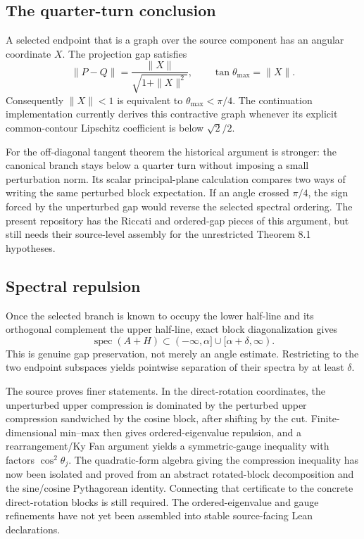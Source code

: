 \subsection{The quarter-turn conclusion}

A selected endpoint that is a graph over the source component has an angular
coordinate $X$.  The projection gap satisfies
\[
 \|P-Q\|=\frac{\|X\|}{\sqrt{1+\|X\|^2}},
 \qquad
 \tan\theta_{\max}=\|X\|.
\]
Consequently $\|X\|<1$ is equivalent to
$\theta_{\max}<\pi/4$.  The continuation implementation currently derives
this contractive graph whenever its explicit common-contour Lipschitz
coefficient is below $\sqrt2/2$.

For the off-diagonal tangent theorem the historical argument is stronger: the
canonical branch stays below a quarter turn without imposing a small
perturbation norm.  Its scalar principal-plane calculation compares two ways
of writing the same perturbed block expectation.  If an angle crossed
$\pi/4$, the sign forced by the unperturbed gap would reverse the selected
spectral ordering.  The present repository has the Riccati and ordered-gap
pieces of this argument, but still needs their source-level assembly for the
unrestricted Theorem 8.1 hypotheses.

\subsection{Spectral repulsion}

Once the selected branch is known to occupy the lower half-line and its
orthogonal complement the upper half-line, exact block diagonalization gives
\[
 \operatorname{spec}(A+H)
 \subset(-\infty,\alpha]\cup[\alpha+\delta,\infty).
\]
This is genuine gap preservation, not merely an angle estimate.  Restricting
to the two endpoint subspaces yields pointwise separation of their spectra by
at least $\delta$.

The source proves finer statements.  In the direct-rotation coordinates, the
unperturbed upper compression is dominated by the perturbed upper compression
sandwiched by the cosine block, after shifting by the cut.  Finite-dimensional
min--max then gives ordered-eigenvalue repulsion, and a rearrangement/Ky Fan
argument yields a symmetric-gauge inequality with factors $\cos^2\theta_j$.
The quadratic-form algebra giving the compression inequality has now been
isolated and proved from an abstract rotated-block decomposition and the
sine/cosine Pythagorean identity.  Connecting that certificate to the
concrete direct-rotation blocks is still required.  The ordered-eigenvalue
and gauge refinements have not yet been assembled into stable source-facing
Lean declarations.

